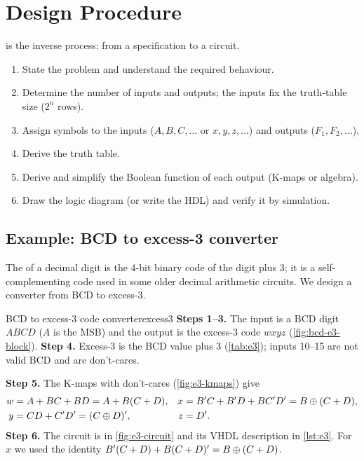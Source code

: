 
\section{Design Procedure}\label{sec:design}
 is the inverse process: from a specification to a circuit.
\begin{enumerate}
  \item State the problem and understand the required behaviour.
  \item Determine the number of inputs and outputs; the inputs fix the truth-table size ($2^n$ rows).
  \item Assign symbols to the inputs ($A,B,C,\dots$ or $x,y,z,\dots$) and outputs ($F_1,F_2,\dots$).
  \item Derive the truth table.
  \item Derive and simplify the Boolean function of each output (K-maps or algebra).
  \item Draw the logic diagram (or write the HDL) and verify it by simulation.
\end{enumerate}

\subsection{Example: BCD to excess-3 converter}
The  of a decimal digit is the 4-bit binary code of the digit plus 3; it is a self-complementing code used in some older decimal arithmetic circuits. We design a converter from BCD to excess-3.

\begin{example}{BCD to excess-3 code converter}{excess3}
\textbf{Steps 1--3.} The input is a BCD digit $ABCD$ ($A$ is the MSB) and the output is the excess-3 code $wxyz$ (\cref{fig:bcd-e3-block}). \textbf{Step 4.} Excess-3 is the BCD value plus 3 (\cref{tab:e3}); inputs 10--15 are not valid BCD and are don't-cares.

\textbf{Step 5.} The K-maps with don't-cares (\cref{fig:e3-kmaps}) give
\begin{align*}
 w &= A + BC + BD = A + B(C+D), & x &= B'C + B'D + BC'D' = B\oplus(C+D),\\
 y &= CD + C'D' = (C\oplus D)', & z &= D'.
\end{align*}
\textbf{Step 6.} The circuit is in \cref{fig:e3-circuit} and its VHDL description in \cref{lst:e3}. For $x$ we used the identity $B'(C+D)+B(C+D)'=B\oplus(C+D)$.
\end{example}

